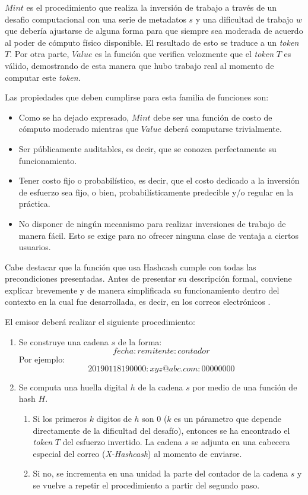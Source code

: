 $Mint$ es el procedimiento que realiza la inversión de trabajo a través de un desafio computacional con una serie de metadatos $s$ y una dificultad de trabajo $w$ que debería ajustarse de alguna forma para que siempre sea moderada de acuerdo al poder de cómputo físico disponible. El resultado de esto se traduce a un \textit{token} $T$. Por otra parte, $Value$ es la función que verifica velozmente que el \textit{token} $T$ es válido, demostrando de esta manera que hubo trabajo real al momento de computar este \textit{token}.

Las propiedades que deben cumplirse para esta familia de funciones son:

\begin{itemize}
  \item Como se ha dejado expresado, $Mint$ debe ser una función de costo de cómputo moderado mientras que $Value$ deberá computarse trivialmente.
  \item Ser públicamente auditables, es decir, que se conozca perfectamente su funcionamiento.
  \item Tener costo fijo o probabilístico, es decir, que el costo dedicado a la inversión de esfuerzo sea fijo, o bien, probabilísticamente predecible y/o regular en la práctica.
  \item No disponer de ningún mecanismo para realizar inversiones de trabajo de manera fácil. Esto se exige para no ofrecer ninguna clase de ventaja a ciertos usuarios.
\end{itemize}

Cabe destacar que la función que usa Hashcash cumple con todas las precondiciones presentadas. Antes de presentar su descripción formal, conviene explicar brevemente y de manera simplificada su funcionamiento dentro del contexto en la cual fue desarrollada, es decir, en los correos electrónicos \cite{Adam2006}.

El emisor deberá realizar el siguiente procedimiento:

\begin{enumerate}
\item Se construye una cadena $s$ de la forma:
\begin{equation}
fecha:remitente:contador
\end{equation}
Por ejemplo:
\begin{equation}
  20190118190000:xyz@abc.com:00000000
\end{equation}
\item Se computa una huella digital $h$ de la cadena $s$ por medio de una función de hash $H$.
  \begin{enumerate}
    \item Si los primeros $k$ digitos de $h$ son 0 ($k$ es un párametro que depende directamente de la dificultad del desafío), entonces se ha encontrado el \textit{token} $T$ del esfuerzo invertido. La cadena $s$ se adjunta en una cabecera especial del correo (\textit{X-Hashcash}) al momento de enviarse.
    \item Si no, se incrementa en una unidad la parte del contador de la cadena $s$ y se vuelve a repetir el procedimiento a partir del segundo paso.
  \end{enumerate}
\end{enumerate}

